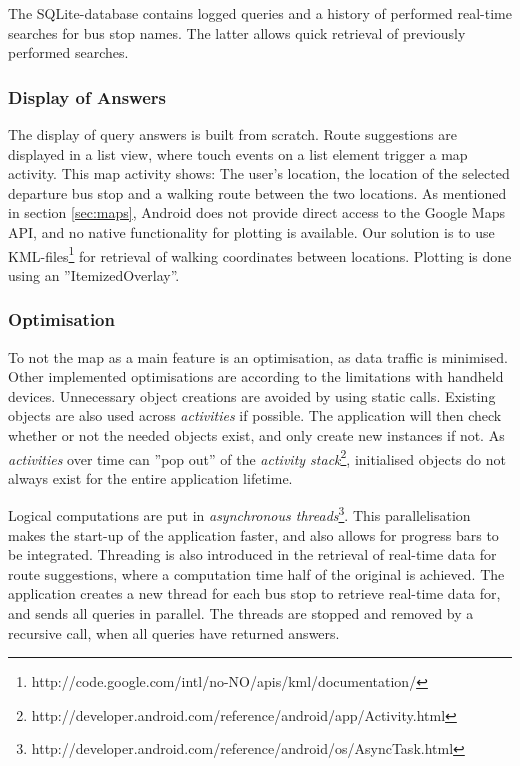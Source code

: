 The SQLite-database contains logged queries and a history of performed real-time searches for bus stop names. The latter allows quick retrieval of previously performed searches.

\subsubsection{Display of Answers}
The display of query answers is built from scratch. Route suggestions are displayed in a list view, where touch events on a list element trigger a map activity. This map activity shows: The user's location, the location of the selected departure bus stop and a walking route between the two locations. As mentioned in section \ref{sec:maps}, Android does not provide direct access to the Google Maps API, and no native functionality for plotting is available. Our solution is to use KML-files\footnote{http://code.google.com/intl/no-NO/apis/kml/documentation/} for retrieval of walking coordinates between locations. Plotting is done using an ''ItemizedOverlay''.



\subsubsection{Optimisation}
To not the map as a main feature is an optimisation, as data traffic is minimised. Other implemented optimisations are according to the limitations with handheld devices. Unnecessary object creations are avoided by using static calls. Existing objects are also used across \emph{activities} if possible. The application will then check whether or not the needed objects exist, and only create new instances if not. As \emph{activities} over time can ''pop out'' of the \emph{activity stack}\footnote{http://developer.android.com/reference/android/app/Activity.html}, initialised objects do not always exist for the entire application lifetime.

Logical computations are put in \emph{asynchronous threads}\footnote{http://developer.android.com/reference/android/os/AsyncTask.html}. This parallelisation makes the start-up of the application faster, and also allows for progress bars to be integrated. Threading is also introduced in the retrieval of real-time data for route suggestions, where a computation time half of the original is achieved. The application creates a new thread for each bus stop to retrieve real-time data for, and sends all queries in parallel. The threads are stopped and removed by a recursive call, when all queries have returned answers.

